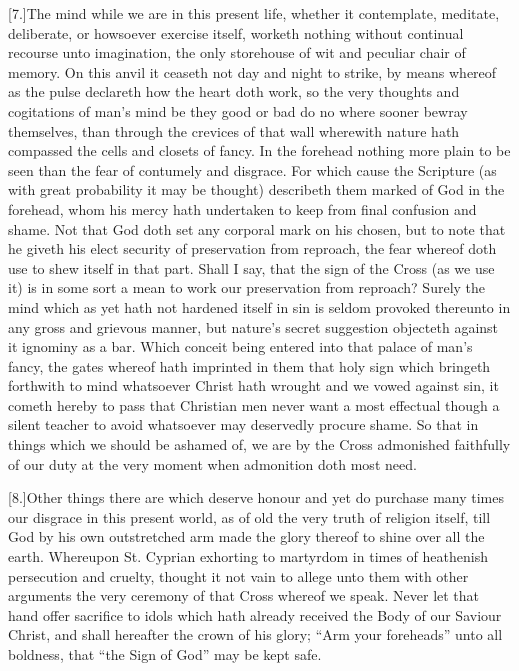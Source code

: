 [7.]The mind while we are in this present life, whether it contemplate, meditate, deliberate, or howsoever exercise itself, worketh nothing without continual recourse unto imagination, the only storehouse of wit and peculiar chair of memory. On this anvil it ceaseth not day and night to strike, by means whereof as the pulse declareth how the heart doth work, so the very thoughts and cogitations of man’s mind be they good or bad do no where sooner bewray themselves, than  through the crevices of that wall wherewith nature hath compassed the cells and closets of fancy.
 In the forehead nothing more plain to be seen than the fear of contumely and disgrace. For which cause the Scripture (as with great probability it may be thought) describeth them marked of God in the forehead, whom his mercy hath undertaken to keep from final confusion and shame. Not that God doth set any corporal mark on his chosen, but to note that he giveth his elect security of preservation from reproach, the fear whereof doth use to shew itself in that part. Shall I say, that the sign of the Cross (as we use it) is in some sort a mean to work our preservation from reproach? Surely the mind which as yet hath not hardened itself in sin is seldom provoked thereunto in any gross and grievous manner, but nature’s secret suggestion objecteth against it ignominy as a bar. Which conceit being entered into that palace of man’s fancy, the gates whereof hath imprinted in them that holy sign which bringeth forthwith to mind whatsoever Christ hath wrought and we vowed against sin, it cometh hereby to pass that Christian men never want a most effectual though a silent teacher to avoid whatsoever may deservedly procure shame. So that in things which we should be ashamed of, we are by the Cross admonished faithfully of our duty at the very moment when admonition doth most need.

[8.]Other things there are which deserve honour and yet do purchase many times our disgrace in this present world, as of old the very truth of religion itself, till God by his own outstretched arm made the glory thereof to shine over all the earth. Whereupon St. Cyprian exhorting to martyrdom in times of heathenish persecution and cruelty, thought it not vain to allege unto them with other arguments the very ceremony of that Cross whereof we speak. Never let that  hand offer sacrifice to idols which hath already received the Body of our Saviour Christ, and shall hereafter the crown of his glory;
 “Arm your foreheads” unto all boldness, that “the Sign of God” may be kept safe.

